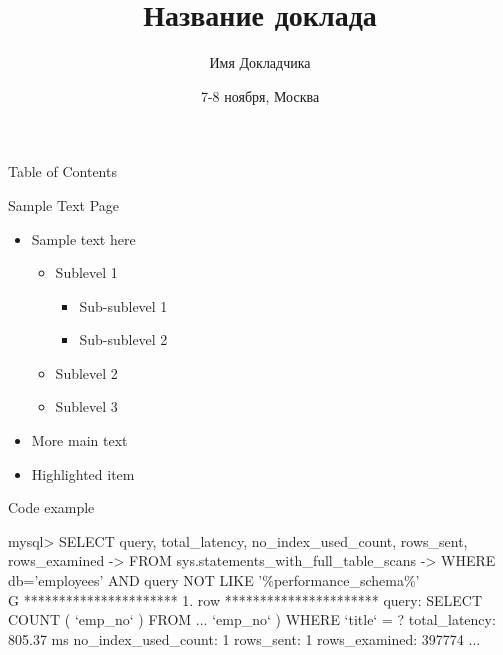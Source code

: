 \documentclass[aspectratio=169]{beamer}
\title[HL++ v.2016]{Название доклада}
\author{Имя Докладчика}
\date{7-8 ноября, Москва}
\begin{document}
        \begin{frame}
                \titlepage
        \end{frame}

	
		\begin{frame}{Table of Contents}
			\vfill
			\tableofcontents
		\end{frame}
		
        \begin{frame}{Sample Text Page}
                \begin{itemize}
                        \item Sample text here
                        \begin{itemize}
                                \item Sublevel 1
                                \begin{itemize}
                                	\item Sub-sublevel 1
                                	\item Sub-sublevel 2
                                \end{itemize}
                                \item Sublevel 2
                                \item Sublevel 3
                        \end{itemize}
                        \item More main text
                        \item \alert{Highlighted item}
                \end{itemize}
        \end{frame}
		
		\begin{frame}[fragile]{Code example}
			\begin{semiverbatim}
				mysql> SELECT query, total_latency, no_index_used_count, rows_sent, rows_examined
				    -> FROM sys.statements_with_full_table_scans 
				    -> WHERE db='employees' AND query NOT LIKE '\%performance_schema\%'\\G
				********************** 1. row **********************
				              query: SELECT COUNT ( `emp_no` ) FROM ...  `emp_no` ) WHERE `title` = ?
				      total_latency: 805.37 ms
				no_index_used_count: 1
				          rows_sent: 1
				      rows_examined: \alert{397774}
				...
			\end{semiverbatim}
		\end{frame}
		
\end{document}
